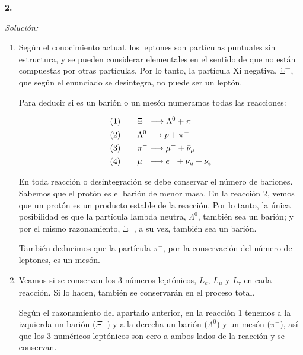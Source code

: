 \textbf{2.}

\vspace{20px}
\textit{Solución:}
\\

\begin{enumerate}
[label=\alph*)]
    \item Según el conocimiento actual, los leptones son partículas puntuales sin estructura, y se pueden considerar
    elementales en el sentido de que no están compuestas por
    otras partículas. Por lo tanto, la partícula Xi negativa, $\Xi^-$, que según el enunciado se desintegra, no puede ser un leptón.

    Para deducir si es un barión o un mesón numeramos todas las reacciones:

    \begin{align*}
    (1)
        \hspace{20px} & \Xi^- \longrightarrow \Lambda^0 + \pi^- \\
        (2) \hspace{20px} & \Lambda^0 \longrightarrow p + \pi^- \\
        (3) \hspace{20px} & \pi^- \longrightarrow \mu^- + \bar{\nu}_{\mu} \\
        (4) \hspace{20px} & \mu^- \longrightarrow e^- + \nu_{\mu} + \bar{\nu}_{e} \\
    \end{align*}

    En toda reacción o desintegración se debe conservar el número de bariones. Sabemos que el protón es el barión de menor masa.
    En la reacción 2, vemos que un protón es un producto estable de la reacción. Por lo tanto, la única posibilidad es que la partícula
    lambda neutra, $\Lambda^0$, también sea un barión; y por el mismo razonamiento, $\Xi^-$, a su vez, también sea un barión.

    También deducimos que la partícula $\pi^-$, por la conservación del número de leptones, es un mesón.

    \vspace{20px}

    \item Veamos si se conservan los 3 números leptónicos, $L_e$, $L_\mu$ y $L_\tau$
    en cada reacción. Si lo hacen, también se conservarán en el proceso total.

    Según el razonamiento del apartado anterior, en la reacción 1 tenemos a la izquierda un barión ($\Xi^-$)
    y a la derecha un barión ($\Lambda^0$) y un mesón ($\pi^-$), así que los 3 numéricos leptónicos son cero a ambos lados de la reacción y se conservan.


\end{enumerate}
